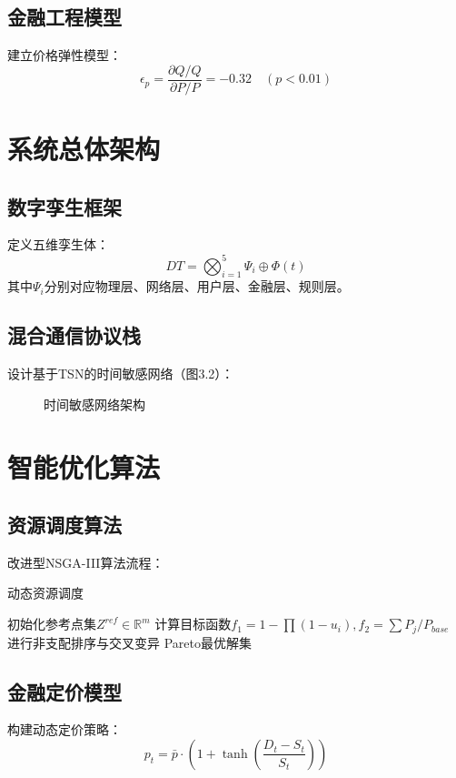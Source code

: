 \documentclass[12pt,a4paper]{IEEEtran} %
\begin{document}
\subsection{金融工程模型}
建立价格弹性模型：
\begin{equation}
  \epsilon_p = \frac{\partial Q/Q}{\partial P/P} = -0.32 \quad (p<0.01)
\end{equation}

\section{系统总体架构}
\subsection{数字孪生框架}
定义五维孪生体：
\begin{equation}
  DT = \bigotimes_{i=1}^5 \Psi_i \oplus \Phi(t)
\end{equation}
其中$\Psi_i$分别对应物理层、网络层、用户层、金融层、规则层。

\subsection{混合通信协议栈}
设计基于TSN的时间敏感网络（图3.2）：
\begin{figure}[htbp]
  \centering
  \caption{时间敏感网络架构}
\end{figure}

\section{智能优化算法}
\subsection{资源调度算法}
改进型NSGA-III算法流程：
\begin{algorithm}[htbp]
  \caption{动态资源调度}
  \begin{algorithmic}[1]
    \State 初始化参考点集$Z^{ref} \in \mathbb{R}^m$
    \State 计算目标函数$f_1=1-\prod(1-u_i), f_2=\sum P_j/P_{base}$
    \State 进行非支配排序与交叉变异
    \EndWhile
    \Return Pareto最优解集
  \end{algorithmic}
\end{algorithm}

\subsection{金融定价模型}
构建动态定价策略：
\begin{equation}
  p_t = \bar{p} \cdot \left(1 + \tanh\left(\frac{D_t - S_t}{S_t}\right)\right)
\end{equation}
\end{document}
